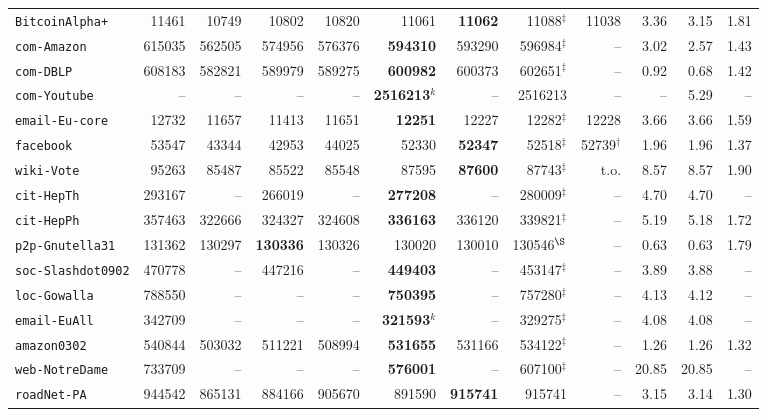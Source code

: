 \begin{tabular}{lrrrrrrrrrrr}
\texttt{BitcoinAlpha+} & \num{11461} & \num{10749} & \num{10802} & \num{10820} & \num{11061} & \textbf{\num{11062}} & \num{11088}$^\ddagger$ & \num{11038} & 3.36 & 3.15 & 1.81 \\
\texttt{com-Amazon} & \num{615035} & \num{562505} & \num{574956} & \num{576376} & \textbf{\num{594310}} & \num{593290} & \num{596984}$^\ddagger$ & -- & 3.02 & 2.57 & 1.43 \\
\texttt{com-DBLP} & \num{608183} & \num{582821} & \num{589979} & \num{589275} & \textbf{\num{600982}} & \num{600373} & \num{602651}$^\ddagger$ & -- & 0.92 & 0.68 & 1.42 \\
\texttt{com-Youtube} & -- & -- & -- & -- & \textbf{\num{2516213}}$^k$ & -- & \num{2516213} & -- & -- & 5.29 & -- \\
\midrule
\texttt{email-Eu-core} & \num{12732} & \num{11657} & \num{11413} & \num{11651} & \textbf{\num{12251}} & \num{12227} & \num{12282}$^\ddagger$ & \num{12228} & 3.66 & 3.66 & 1.59 \\
\texttt{facebook} & \num{53547} & \num{43344} & \num{42953} & \num{44025} & \num{52330} & \textbf{\num{52347}} & \num{52518}$^\ddagger$ & \num{52739}$^\dagger$ & 1.96 & 1.96 & 1.37 \\
\texttt{wiki-Vote} & \num{95263} & \num{85487} & \num{85522} & \num{85548} & \num{87595} & \textbf{\num{87600}} & \num{87743}$^\ddagger$ & t.o. & 8.57 & 8.57 & 1.90 \\
\texttt{cit-HepTh} & \num{293167} & -- & \num{266019} & -- & \textbf{\num{277208}} & -- & \num{280009}$^\ddagger$ & -- & 4.70 & 4.70 & -- \\
\texttt{cit-HepPh} & \num{357463} & \num{322666} & \num{324327} & \num{324608} & \textbf{\num{336163}} & \num{336120} & \num{339821}$^\ddagger$ & -- & 5.19 & 5.18 & 1.72 \\
\texttt{p2p-Gnutella31} & \num{131362} & \num{130297} & \textbf{\num{130336}} & \num{130326} & \num{130020} & \num{130010} & \num{130546}$^\S$ & -- & 0.63 & 0.63 & 1.79 \\
\texttt{soc-Slashdot0902} & \num{470778} & -- & \num{447216} & -- & \textbf{\num{449403}} & -- & \num{453147}$^\ddagger$ & -- & 3.89 & 3.88 & -- \\
\texttt{loc-Gowalla} & \num{788550} & -- & -- & -- & \textbf{\num{750395}} & -- & \num{757280}$^\ddagger$ & -- & 4.13 & 4.12 & -- \\
\texttt{email-EuAll} & \num{342709} & -- & -- & -- & \textbf{\num{321593}}$^k$ & -- & \num{329275}$^\ddagger$ & -- & 4.08 & 4.08 & -- \\
\texttt{amazon0302} & \num{540844} & \num{503032} & \num{511221} & \num{508994} & \textbf{\num{531655}} & \num{531166} & \num{534122}$^\ddagger$ & -- & 1.26 & 1.26 & 1.32 \\
\texttt{web-NotreDame} & \num{733709} & -- & -- & -- & \textbf{\num{576001}} & -- & \num{607100}$^\ddagger$ & -- & 20.85 & 20.85 & -- \\
\texttt{roadNet-PA} & \num{944542} & \num{865131} & \num{884166} & \num{905670} & \num{891590} & \textbf{\num{915741}} & \num{915741} & -- & 3.15 & 3.14 & 1.30 \\
\bottomrule
\end{tabular}
